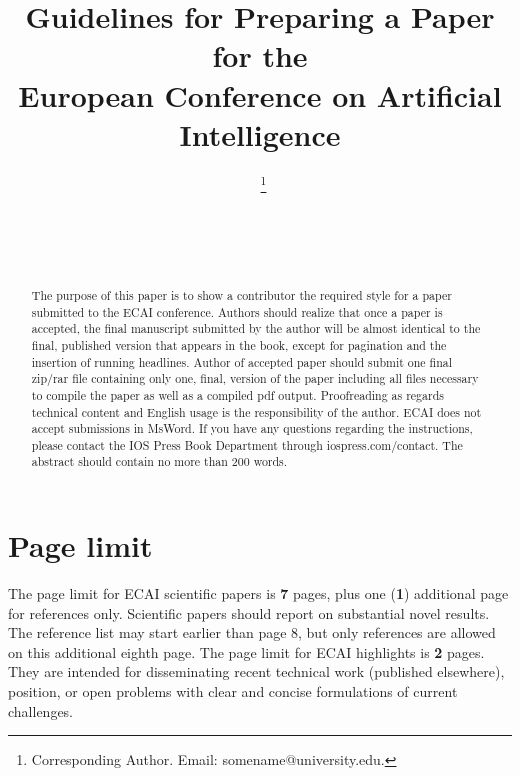 \documentclass{ecai}
\begin{document}
\begin{frontmatter}

\title{Guidelines for Preparing a Paper for the \\
European Conference on Artificial Intelligence}

\author[A]{~\thanks{Corresponding Author. Email: somename@university.edu.}}
\author[B]{~}
\author[B]{~} %


\address[A]{Short Affiliation of First Author}
\address[B]{Short Affiliation of Second Author and Third Author}

\begin{abstract}
The purpose of this paper is to show a contributor the required style for a paper submitted to the ECAI conference.
Authors should realize that once a paper is accepted, the final manuscript submitted by the author will be almost
identical to the final, published version that appears in the book, except for pagination and the insertion of running headlines.
Author of accepted paper should submit one final zip/rar file containing only one, final, version of the paper
including all files necessary to compile the paper as well as a compiled pdf output. Proofreading as regards
technical content and English usage is the responsibility of the author. ECAI does not accept submissions in MsWord.
If you have any questions regarding the instructions, please contact the IOS Press Book Department through iospress.com/contact.
The abstract should contain no more than 200 words.
\end{abstract}

\end{frontmatter}

\section{Page limit}
%

The page limit for ECAI scientific papers is {\bf 7} pages, plus one ({\bf 1})
additional page for references only. Scientific papers should report on substantial novel results. The reference list may start earlier than page 8, but only references are allowed on this additional eighth page.
The page limit for ECAI highlights is {\bf 2} pages. They are intended for disseminating  recent technical work (published elsewhere), position, or open problems with clear and concise formulations of current challenges.
\end{document}
